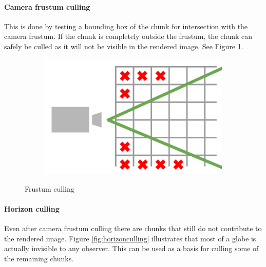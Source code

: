 \paragraph{Camera frustum culling} This is done by testing a bounding box of the chunk for intersection with the camera frustum. If the chunk is completely outside the frustum, the chunk can safely be culled as it will not be visible in the rendered image. See Figure \ref{fig:frustumculling}.

\begin{figure}[htbp]
    \centering
    \begin{subfigure}[bt]{0.4\textwidth}
        \includegraphics[width=\textwidth]{figures/chunkedlod/frustumculling.pdf}
    \end{subfigure}
    \caption{Frustum culling}
    \label{fig:frustumculling}
\end{figure}

\paragraph{Horizon culling} Even after camera frustum culling there are chunks that still do not contribute to the rendered image. Figure \ref{fig:horizonculling} illustrates that most of a globe is actually invisible to any observer. This can be used as a basis for culling some of the remaining chunks. 

